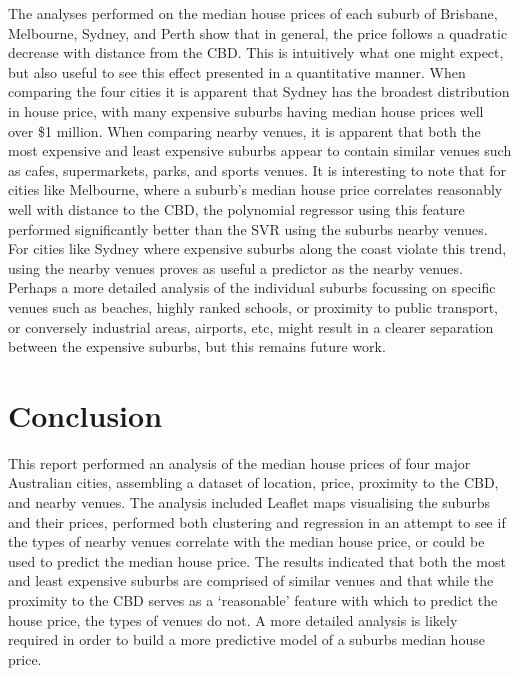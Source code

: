 \documentclass[12pt]{article}
\begin{document}
    The analyses performed on the median house prices of each suburb of Brisbane, Melbourne, Sydney, and Perth show that in general, the price follows a quadratic decrease with distance from the CBD. This is intuitively what one might expect, but also useful to see this effect presented in a quantitative manner. When comparing the four cities it is apparent that Sydney has the broadest distribution in house price, with many expensive suburbs having median house prices well over \$1 million. When comparing nearby venues, it is apparent that both the most expensive and least expensive suburbs appear to contain similar venues such as cafes, supermarkets, parks, and sports venues. It is interesting to note that for cities like Melbourne, where a suburb's median house price correlates reasonably well with distance to the CBD, the polynomial regressor using this feature performed significantly better than the SVR using the suburbs nearby venues. For cities like Sydney where expensive suburbs along the coast violate this trend, using the nearby venues proves as useful a predictor as the nearby venues. Perhaps a more detailed analysis of the individual suburbs focussing on specific venues such as beaches, highly ranked schools, or proximity to public transport, or conversely industrial areas, airports, etc, might result in a clearer separation between the expensive suburbs, but this remains future work.  

\section{Conclusion}

    This report performed an analysis of the median house prices of four major Australian cities, assembling a dataset of location, price, proximity to the CBD, and nearby venues. The analysis included Leaflet maps visualising the suburbs and their prices, performed both clustering and regression in an attempt to see if the types of nearby venues correlate with the median house price, or could be used to predict the median house price. The results indicated that both the most and least expensive suburbs are comprised of similar venues and that while the proximity to the CBD serves as a `reasonable' feature with which to predict the house price, the types of venues do not. A more detailed analysis is likely required in order to build a more predictive model of a suburbs median house price.
\end{document}
